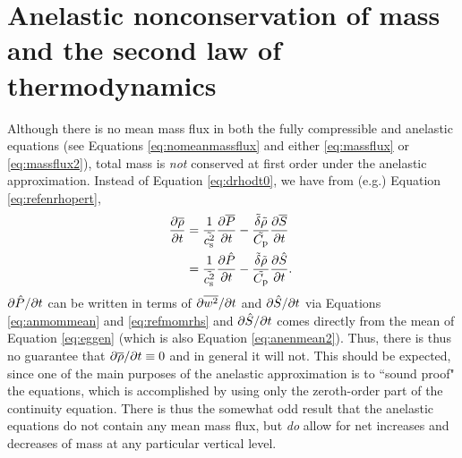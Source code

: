\documentclass[12pt]{article}
\newcommand{\heatnomassflux}{Q_{\rm nomassflux}}
\begin{document}

\section{Anelastic nonconservation of mass and the second law of thermodynamics}\label{sec:secondlaw}
Although there is no mean mass flux in both the fully compressible and anelastic equations (see Equations \eqref{eq:nomeanmassflux} and either \eqref{eq:massflux} or \eqref{eq:massflux2}), total mass is \textit{not} conserved at first order under the anelastic approximation. Instead of Equation \eqref{eq:drhodt0}, we have from (e.g.) Equation \eqref{eq:refenrhopert}, 
\begin{align}\label{eq:drhodtnot0}
 \frac{\partial\overline{\rho}}{\partial t} &= \frac{1}{\tilde{c_{\rm s}^2}}\frac{\partial\overline{P}}{\partial t}-\frac{\tilde{\delta} \tilde{\rho}}{\tilde{C_{\rm{p}}}}\frac{\partial\overline{S}}{\partial t}\nonumber\\
 &=  \frac{1}{\tilde{c_{\rm s}^2}}\frac{\partial\hat{P}}{\partial t}-\frac{\tilde{\delta} \tilde{\rho}}{\tilde{C_{\rm{p}}}}\frac{\partial\hat{S}}{\partial t}.\
\end{align}
$\partial\hat{P}/\partial t$ can be written in terms of $\partial\overline{w^2}/\partial t$ and $\partial\hat{S}/\partial t$ via Equations \eqref{eq:anmommean} and \eqref{eq:refmomrhs} and $\partial\hat{S}/\partial t$ comes directly from the mean of Equation \eqref{eq:eggen} (which is also Equation \eqref{eq:anenmean2}). Thus, there is thus no guarantee that $\partial\overline{\rho}/\partial t\equiv0$ and in general it will not. This should be expected, since one of the main purposes of the anelastic approximation is to ``sound proof" the equations, which is accomplished by using only the zeroth-order part of the continuity equation. There is thus the somewhat odd result that the anelastic equations do not contain any mean mass flux, but \textit{do} allow for net increases and decreases of mass at any particular vertical level. 
\end{document}
